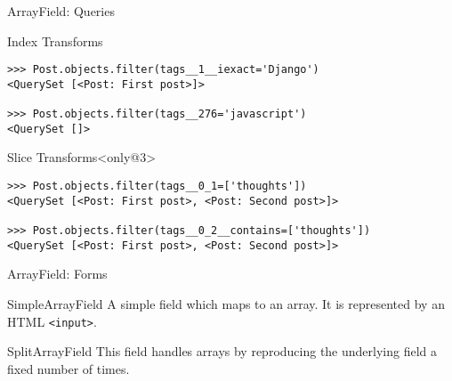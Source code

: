\begin{frame}[fragile]{ArrayField: Queries}
\begin{block}{Index Transforms}
\begin{verbatim}
>>> Post.objects.filter(tags__1__iexact='Django')
<QuerySet [<Post: First post>]>

>>> Post.objects.filter(tags__276='javascript')
<QuerySet []>
        \end{verbatim}
    \end{block}
    \begin{block}{Slice Transforms}<only@3>
        \begin{verbatim}
>>> Post.objects.filter(tags__0_1=['thoughts'])
<QuerySet [<Post: First post>, <Post: Second post>]>

>>> Post.objects.filter(tags__0_2__contains=['thoughts'])
<QuerySet [<Post: First post>, <Post: Second post>]>
        \end{verbatim}
    \end{block}

\end{frame}

\begin{frame}{ArrayField: Forms}
    \begin{block}{SimpleArrayField}
        A simple field which maps to an array. It is represented by an HTML \texttt{<input>}.
    \end{block}
    \begin{block}{SplitArrayField}
        This field handles arrays by reproducing the underlying field a fixed number of times.
    \end{block}
\end{frame}

